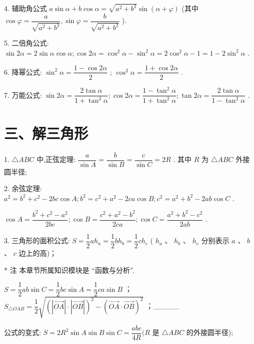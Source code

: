 4. 辅助角公式 $a\sin \alpha  + b\cos \alpha  = \sqrt{{a}^{2} + {b}^{2}}\sin \left( {\alpha  + \varphi }\right)$ (其中 $\cos \varphi  = \dfrac{a}{\sqrt{{a}^{2} + {b}^{2}}},\sin \varphi  = \dfrac{b}{\sqrt{{a}^{2} + {b}^{2}}}$ ).

5. 二倍角公式: $\sin {2\alpha } = 2\sin \alpha \cos \alpha ;\cos {2\alpha } = {\cos }^{2}\alpha  - {\sin }^{2}\alpha  = 2{\cos }^{2}\alpha  - 1 = 1 - 2{\sin }^{2}\alpha$ .

6. 降幂公式: ${\sin }^{2}\alpha  = \dfrac{1 - \cos {2\alpha }}{2}$ ; ${\cos }^{2}\alpha  = \dfrac{1 + \cos {2\alpha }}{2}$ .

7. 万能公式: $\sin {2\alpha } = \dfrac{2\tan \alpha }{1 + {\tan }^{2}\alpha };\cos {2\alpha } = \dfrac{1 - {\tan }^{2}\alpha }{1 + {\tan }^{2}\alpha };\tan {2\alpha } = \dfrac{2\tan \alpha }{1 - {\tan }^{2}\alpha }$ .

\section*{三、解三角形}

1. $\bigtriangleup {ABC}$ 中,正弦定理: $\dfrac{a}{\sin A} = \dfrac{b}{\sin B} = \dfrac{c}{\sin C} = {2R}$ . 其中 $R$ 为 $\bigtriangleup {ABC}$ 外接圆半径;

2. 余弦定理: ${a}^{2} = {b}^{2} + {c}^{2} - {2bc}\cos A;{b}^{2} = {c}^{2} + {a}^{2} - {2ca}\cos B;{c}^{2} = {a}^{2} + {b}^{2} - {2ab}\cos C$ .

$\cos A = \dfrac{{b}^{2} + {c}^{2} - {a}^{2}}{2bc};\cos B = \dfrac{{c}^{2} + {a}^{2} - {b}^{2}}{2ca};\cos C = \dfrac{{a}^{2} + {b}^{2} - {c}^{2}}{2ab}$ .

3. 三角形的面积公式:   $S = \dfrac{1}{2}a{h}_{a} = \dfrac{1}{2}b{h}_{b} = \dfrac{1}{2}c{h}_{c}$ ( ${h}_{a}$ 、 ${h}_{b}$ 、 ${h}_{c}$ 分别表示 $a$ 、 $b$ 、 $c$ 边上的高)；



* 注 本章节所属知识模块是 “函数与分析”.



   $S = \dfrac{1}{2}{ab}\sin C = \dfrac{1}{2}{bc}\sin A = \dfrac{1}{2}{ca}\sin B$ ；   ${S}_{\bigtriangleup {OAB}} = \dfrac{1}{2}\sqrt{{\left( \left| \overrightarrow{OA}\right|  \cdot  \left| \overrightarrow{OB}\right| \right) }^{2} - {\left( \overrightarrow{OA} \cdot  \overrightarrow{OB}\right) }^{2}}$ ；\_\_\_\_\_

公式的变式: $S = 2{R}^{2}\sin A\sin B\sin C = \dfrac{abc}{4R}(R$ 是 $\bigtriangleup {ABC}$ 的外接圆半径);

